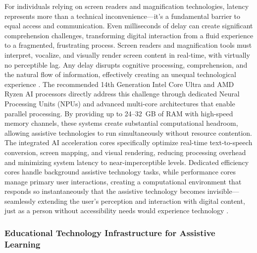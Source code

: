 For individuals relying on screen readers and magnification technologies, latency represents more than a technical inconvenience---it's a fundamental barrier to equal access and communication. Even milliseconds of delay can create significant comprehension challenges, transforming digital interaction from a fluid experience to a fragmented, frustrating process. Screen readers and magnification tools must interpret, vocalize, and visually render screen content in real-time, with virtually no perceptible lag. Any delay disrupts cognitive processing, comprehension, and the natural flow of information, effectively creating an unequal technological experience \cite{Fowler2011ScreenReaderLatency, Nielsen1993UsabilityEngineering}. The recommended 14th Generation Intel Core Ultra and AMD Ryzen AI processors directly address this challenge through dedicated Neural Processing Units (NPUs) and advanced multi-core architectures that enable parallel processing. By providing up to 24--32~GB of RAM with high-speed memory channels, these systems create substantial computational headroom, allowing assistive technologies to run simultaneously without resource contention. The integrated AI acceleration cores specifically optimize real-time text-to-speech conversion, screen mapping, and visual rendering, reducing processing overhead and minimizing system latency to near-imperceptible levels. Dedicated efficiency cores handle background assistive technology tasks, while performance cores manage primary user interactions, creating a computational environment that responds so instantaneously that the assistive technology becomes invisible---seamlessly extending the user's perception and interaction with digital content, just as a person without accessibility needs would experience technology \cite{AIinAccessibility, EducationalEquityReport2024}.


\subsubsection{Educational Technology Infrastructure for Assistive Learning}

